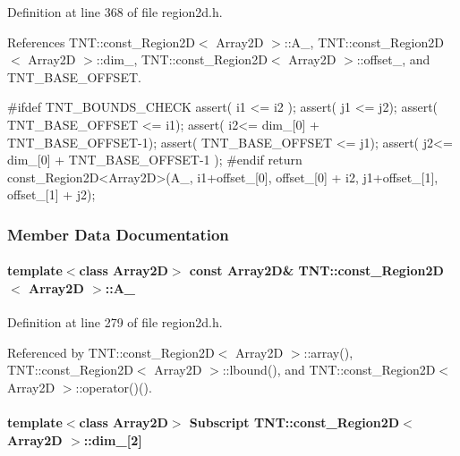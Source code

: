 Definition at line 368 of file region2d.h.



References TNT::const\_\-Region2D$<$ Array2D $>$::A\_\-, TNT::const\_\-Region2D$<$ Array2D $>$::dim\_\-, TNT::const\_\-Region2D$<$ Array2D $>$::offset\_\-, and TNT\_\-BASE\_\-OFFSET.




\begin{DoxyCode}
        {
#ifdef TNT_BOUNDS_CHECK
            assert( i1 <= i2 );
            assert( j1 <= j2);
            assert( TNT_BASE_OFFSET <= i1);
            assert( i2<= dim_[0] + TNT_BASE_OFFSET-1);
            assert( TNT_BASE_OFFSET <= j1);
            assert( j2<= dim_[0] + TNT_BASE_OFFSET-1 );
#endif
            return const_Region2D<Array2D>(A_, 
                    i1+offset_[0], offset_[0] + i2, 
                    j1+offset_[1], offset_[1] + j2);
        }
\end{DoxyCode}




\subsubsection{Member Data Documentation}
\paragraph[{A\_\-}]{\setlength{\rightskip}{0pt plus 5cm}template$<$class Array2D$>$ const Array2D\& {\bf TNT::const\_\-Region2D}$<$ Array2D $>$::{\bf A\_\-}}\hfill\label{class_t_n_t_1_1const___region2_d_a714d4a4f74d4869914a16638be66106e}


Definition at line 279 of file region2d.h.



Referenced by TNT::const\_\-Region2D$<$ Array2D $>$::array(), TNT::const\_\-Region2D$<$ Array2D $>$::lbound(), and TNT::const\_\-Region2D$<$ Array2D $>$::operator()().

\paragraph[{dim\_\-}]{\setlength{\rightskip}{0pt plus 5cm}template$<$class Array2D$>$ {\bf Subscript} {\bf TNT::const\_\-Region2D}$<$ Array2D $>$::{\bf dim\_\-}\mbox{[}2\mbox{]}}\hfill\label{class_t_n_t_1_1const___region2_d_a26098b3d9738f86a5ef5bdd1f88117d7}


